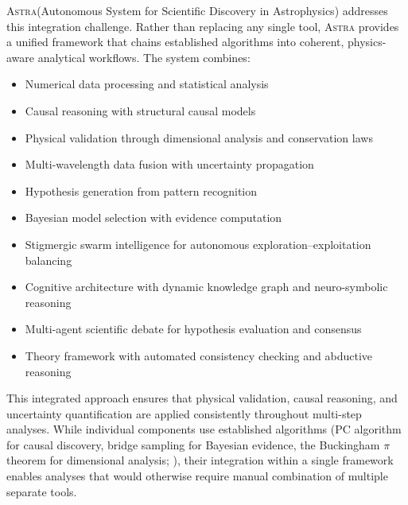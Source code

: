 \documentclass[usenatbib]{rasti}
\newcommand{\astra}{\textsc{Astra}\xspace}
\newcommand{\pc}{PC\xspace}
\begin{document}
\astra (Autonomous System for Scientific Discovery in Astrophysics) addresses this integration challenge.
Rather than replacing any single tool, \astra provides a unified framework that chains established algorithms into coherent, physics-aware analytical workflows.
The system combines:
\begin{itemize}
  \item Numerical data processing and statistical analysis
  \item Causal reasoning with structural causal models
  \item Physical validation through dimensional analysis and conservation laws
  \item Multi-wavelength data fusion with uncertainty propagation
  \item Hypothesis generation from pattern recognition
  \item Bayesian model selection with evidence computation
  \item Stigmergic swarm intelligence for autonomous exploration--exploitation balancing
  \item Cognitive architecture with dynamic knowledge graph and neuro-symbolic reasoning
  \item Multi-agent scientific debate for hypothesis evaluation and consensus
  \item Theory framework with automated consistency checking and abductive reasoning
\end{itemize}

This integrated approach ensures that physical validation, causal reasoning, and uncertainty quantification are applied consistently throughout multi-step analyses.
While individual components use established algorithms (\pc algorithm for causal discovery, bridge sampling for Bayesian evidence, the Buckingham $\pi$ theorem for dimensional analysis; \citealt{Buckingham1914}), their integration within a single framework enables analyses that would otherwise require manual combination of multiple separate tools.
\end{document}
